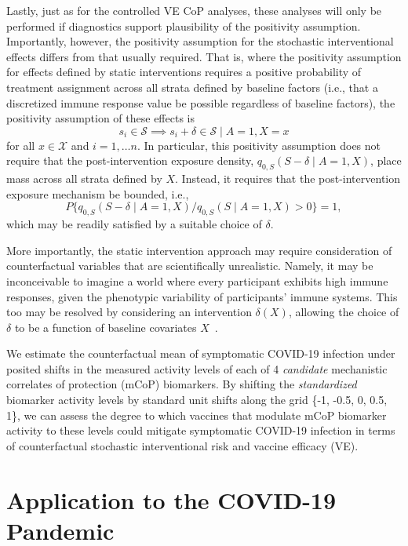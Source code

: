 Lastly, just as for the controlled VE CoP analyses, these analyses will only be
performed if diagnostics support plausibility of the positivity assumption.
Importantly, however, the positivity assumption for the stochastic
interventional effects differs from that usually required. That is, where the
positivity assumption for effects defined by static interventions requires
a positive probability of treatment assignment across all strata defined by
baseline factors (i.e., that a discretized immune response value be possible
regardless of baseline factors), the positivity assumption of these effects is
$$s_i \in \mathcal{S} \implies s_i + \delta
    \in \mathcal{S} \mid A = 1, X = x$$
\noindent for all $x \in \mathcal{X}$ and
    $i = 1, \ldots n$.
In particular, this positivity assumption does not require that the
post-intervention exposure density, $q_{0,S}(S - \delta \mid A = 1, X)$,  place
mass across all strata defined by $X$. Instead, it requires that the
post-intervention exposure mechanism be bounded, i.e.,
$$P
\{q_{0,S}(S - \delta \mid A = 1, X) / q_{0,S}(S \mid A = 1, X) > 0 \} = 1,$$
\noindent which may be readily satisfied by a suitable choice of $\delta$.

More importantly, the static intervention approach may require consideration of
counterfactual variables that are scientifically unrealistic. Namely, it may be
inconceivable to imagine a world where every participant exhibits high immune
responses, given the phenotypic variability of participants' immune systems.
This too may be resolved by considering an intervention $\delta(X)$, allowing
the choice of $\delta$ to be a function of baseline covariates
$X$~\citep{hejazi2020efficient, diaz2012population, haneuse2013estimation,
diaz2018stochastic}.

We estimate the counterfactual mean of symptomatic COVID-19 infection
under posited shifts in the measured activity levels of each of 4
\emph{candidate} mechanistic correlates of protection (mCoP) biomarkers.
By shifting the \emph{standardized} biomarker activity levels by
standard unit shifts along the grid \{-1, -0.5, 0, 0.5, 1\}, we can
assess the degree to which vaccines that modulate mCoP biomarker
activity to these levels could mitigate symptomatic COVID-19 infection
in terms of counterfactual stochastic interventional risk and vaccine
efficacy (VE).

\section{Application to the COVID-19 Pandemic}

